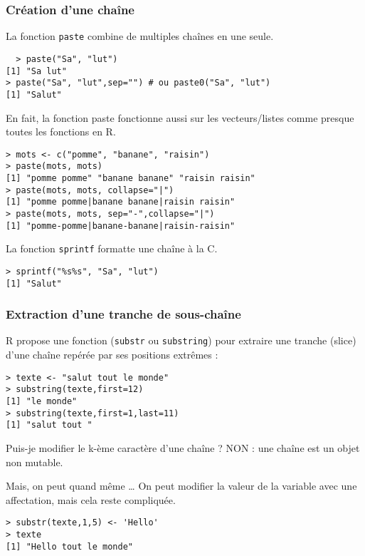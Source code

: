 \documentclass[10pt]{beamer}
\begin{document}
\begin{frame}[fragile]
  \frametitle{Création d'une chaîne}
  La fonction \alert{\texttt{paste}} combine de multiples chaînes en une seule.
  \begin{lstlisting}
  > paste("Sa", "lut")
[1] "Sa lut"
> paste("Sa", "lut",sep="") # ou paste0("Sa", "lut")
[1] "Salut"
\end{lstlisting}
En fait, la fonction paste fonctionne aussi sur les vecteurs/listes comme presque toutes les fonctions en R.
\begin{lstlisting}
> mots <- c("pomme", "banane", "raisin")
> paste(mots, mots)
[1] "pomme pomme" "banane banane" "raisin raisin"
> paste(mots, mots, collapse="|")
[1] "pomme pomme|banane banane|raisin raisin"
> paste(mots, mots, sep="-",collapse="|")
[1] "pomme-pomme|banane-banane|raisin-raisin"
\end{lstlisting}
La fonction \alert{\texttt{sprintf}} formatte une chaîne à la C.
\begin{lstlisting}
> sprintf("%s%s", "Sa", "lut")
[1] "Salut"
\end{lstlisting}
\end{frame}

\begin{frame}[fragile]
  \frametitle{Extraction d'une tranche de sous-chaîne}
  R propose une fonction (\alert{\texttt{substr}} ou \alert{\texttt{substring}}) pour extraire une tranche (slice) d'une chaîne repérée par ses positions extrêmes :
  \begin{lstlisting}
> texte <- "salut tout le monde"
> substring(texte,first=12)
[1] "le monde"
> substring(texte,first=1,last=11)
[1] "salut tout "
\end{lstlisting}

\begin{alertblock}{Puis-je modifier le k-ème caractère d'une chaîne ?}
  \alert{NON} : une chaîne est un objet non mutable.
\end{alertblock}

\begin{exampleblock}{Mais, on peut quand même \dots}
  On peut modifier la valeur de la variable avec une affectation, mais cela reste compliquée.
  \begin{lstlisting}
> substr(texte,1,5) <- 'Hello'
> texte
[1] "Hello tout le monde"
  \end{lstlisting}
\end{exampleblock}
\end{frame}
\end{document}
